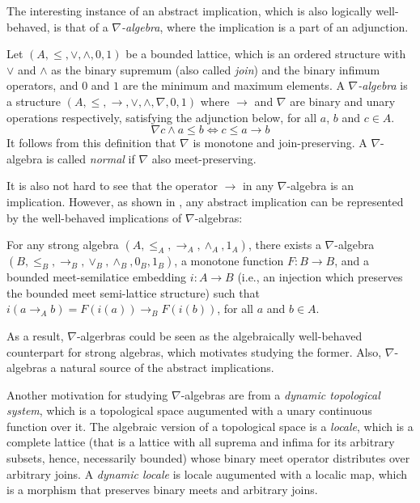   The interesting instance of an abstract implication, which is also logically well-behaved, is that of a \emph{$\nabla$-algebra}, where the implication is a part of an adjunction.

  \begin{dfn}\label{dfn:n-alg} Let $(A, \le, \vee, \wedge, 0, 1)$ be a bounded lattice, which is an ordered structure with $\vee$ and $\wedge$ as the binary supremum (also called \emph{join}) and the binary infimum operators, and $0$ and $1$ are the minimum and maximum elements. A \emph{$\nabla$-algebra} is a structure $(A, \le, \rightarrow, \vee, \wedge, \nabla, 0, 1)$ where $\rightarrow$ and $\nabla$ are binary and unary operations respectively, satisfying the adjunction below, for all $a$, $b$ and $c \in A$.
  \[ \nabla c \wedge a \le b \iff c \le a \rightarrow b \]
  It follows from this definition that $\nabla$ is monotone and join-preserving. A $\nabla$-algebra is called \emph{normal} if $\nabla$ also meet-preserving.
  \end{dfn}

  It is also not hard to see that the operator $\rightarrow$ in any $\nabla$-algebra is an implication. However, as shown in \cite{amir}, any abstract implication can be represented by the well-behaved implications of $\nabla$-algebras:

  \begin{thm}
  For any strong algebra $(A, \le_A, \rightarrow_A, \wedge_A, 1_A)$, there exists a $\nabla$-algebra $(B, \le_B, \rightarrow_B, \vee_B, \wedge_B, 0_B, 1_B)$, a monotone function $F : B \to B$, and a bounded meet-semilatice embedding $i : A \to B$ (i.e., an injection which preserves the bounded meet semi-lattice structure) such that $i(a \rightarrow_A b) = F(i(a)) \rightarrow_B F(i(b))$, for all $a$ and $b \in A$.
  \end{thm}

  As a result, $\nabla$-algerbras could be seen as the algebraically well-behaved counterpart for strong algebras, which motivates studying the former. Also, $\nabla$-algebras a natural source of the abstract implications.
  \vspace*{2mm}
  
  Another motivation for studying $\nabla$-algebras are from a \emph{dynamic topological system}, which is a topological space augumented with a unary continuous function over it. The algebraic version of a topological space is a \emph{locale}, which is a complete lattice (that is a lattice with all suprema and infima for its arbitrary subsets, hence, necessarily bounded) whose binary meet operator distributes over arbitrary joins. A \emph{dynamic locale} is locale augumented with a localic map, which is a morphism that preserves binary meets and arbitrary joins.
  
